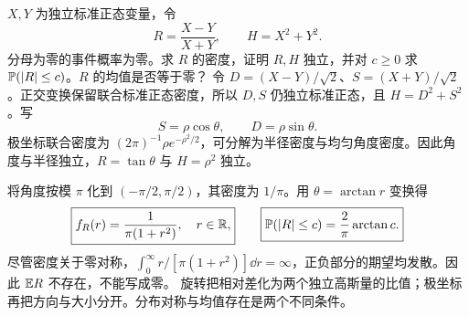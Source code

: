 $X,Y$ 为独立标准正态变量，令
\[
R=\frac{X-Y}{X+Y},\qquad H=X^2+Y^2.
\]
分母为零的事件概率为零。求 $R$ 的密度，证明 $R,H$ 独立，并对 $c\ge0$ 求 $\mathbb{P}(|R|\le c)$。$R$ 的均值是否等于零？
\solution 令 $D=(X-Y)/\sqrt2$、$S=(X+Y)/\sqrt2$。正交变换保留联合标准正态密度，所以 $D,S$ 仍独立标准正态，且 $H=D^2+S^2$。写
\[
S=\rho\cos\theta,\qquad D=\rho\sin\theta.
\]
极坐标联合密度为 $(2\pi)^{-1}\rho e^{-\rho^2/2}$，可分解为半径密度与均匀角度密度。因此角度与半径独立，$R=\tan\theta$ 与 $H=\rho^2$ 独立。

将角度按模 $\pi$ 化到 $(-\pi/2,\pi/2)$，其密度为 $1/\pi$。用 $\theta=\arctan r$ 变换得
\[
\boxed{f_R(r)=\frac1{\pi(1+r^2)},\quad r\in\mathbb R,}
\qquad
\boxed{\mathbb{P}(|R|\le c)=\frac2\pi\arctan c.}
\]
尽管密度关于零对称，$\int_0^\infty r/[\pi(1+r^2)]\dd r=\infty$，正负部分的期望均发散。因此 $\mathbb{E} R$ 不存在，不能写成零。
\insight 旋转把相对差化为两个独立高斯量的比值；极坐标再把方向与大小分开。分布对称与均值存在是两个不同条件。

